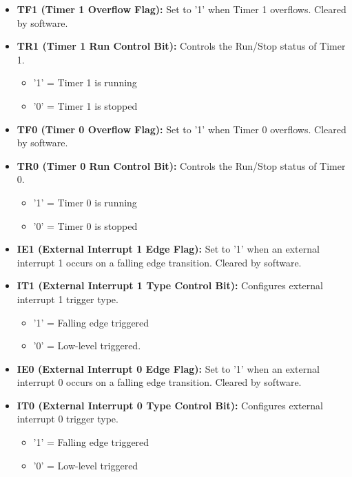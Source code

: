 \documentclass[
]{article}
\begin{document}
\begin{itemize}
\item
  \textbf{TF1 (Timer 1 Overflow Flag):} Set to '1' when Timer 1
  overflows. Cleared by software.
\item
  \textbf{TR1 (Timer 1 Run Control Bit):} Controls the Run/Stop status
  of Timer 1.

  \begin{itemize}
  \item
    '1' = Timer 1 is running
  \item
    '0' = Timer 1 is stopped
  \end{itemize}
\item
  \textbf{TF0 (Timer 0 Overflow Flag):} Set to '1' when Timer 0
  overflows. Cleared by software.
\item
  \textbf{TR0 (Timer 0 Run Control Bit):} Controls the Run/Stop status
  of Timer 0.

  \begin{itemize}
  \item
    '1' = Timer 0 is running
  \item
    '0' = Timer 0 is stopped
  \end{itemize}
\item
  \textbf{IE1 (External Interrupt 1 Edge Flag):} Set to '1' when an
  external interrupt 1 occurs on a falling edge transition. Cleared by
  software.
\item
  \textbf{IT1 (External Interrupt 1 Type Control Bit):} Configures
  external interrupt 1 trigger type.

  \begin{itemize}
  \item
    '1' = Falling edge triggered
  \item
    '0' = Low-level triggered.
  \end{itemize}
\item
  \textbf{IE0 (External Interrupt 0 Edge Flag):} Set to '1' when an
  external interrupt 0 occurs on a falling edge transition. Cleared by
  software.
\item
  \textbf{IT0 (External Interrupt 0 Type Control Bit):} Configures
  external interrupt 0 trigger type.

  \begin{itemize}
  \item
    '1' = Falling edge triggered
  \item
    '0' = Low-level triggered
  \end{itemize}
\end{itemize}
\end{document}
